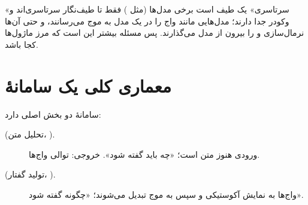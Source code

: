 \begin{correctionbox}{«سرتاسری» یک طیف است}
برخی مدل‌ها (مثل ) فقط تا طیف‌نگار سرتاسری‌اند و وکودر جدا دارند؛ مدل‌هایی مانند  واج را در یک مدل به موج می‌رسانند، و حتی آن‌ها نرمال‌سازی و  را بیرون از مدل می‌گذارند. پس مسئله بیشتر این است که مرز ماژول‌ها کجا باشد.
\end{correctionbox}

\section{معماری کلی یک سامانهٔ }

سامانهٔ  دو بخش اصلی دارد:
\begin{description}
  \item[ (تحلیل متن، ).] ورودی هنوز متن است؛ «چه باید گفته شود». خروجی: توالی واج‌ها.
  \item[ (تولید گفتار، ).] واج‌ها به نمایش آکوستیکی و سپس به موج تبدیل می‌شوند؛ «چگونه گفته شود».
\end{description}

